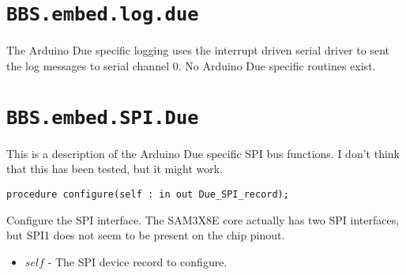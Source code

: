 \documentclass[10pt, openany]{book}
\newcommand{\indexfunc}[1]{\index[func]{#1}}
\newcommand{\package}[1]{\texttt{#1}}
\begin{document}
\section{\package{BBS.embed.log.due}}
The Arduino Due specific logging uses the interrupt driven serial driver to sent the log messages to serial channel 0.  No Arduino Due specific routines exist.

\section{\package{BBS.embed.SPI.Due}}
This is a description of the Arduino Due specific SPI bus functions.  I don't think that this has been tested, but it might work.

\begin{lstlisting}
procedure configure(self : in out Due_SPI_record);
\end{lstlisting}
\indexfunc{configure}
Configure the SPI interface.  The SAM3X8E core actually has two SPI interfaces, but SPI1 does not seem to be present on the chip pinout.
\begin{itemize}
  \item $self$ - The SPI device record to configure.
\end{itemize}

\clearpage
%
%
\printindex[type]
\printindex[func]
%
%


\end{document}
